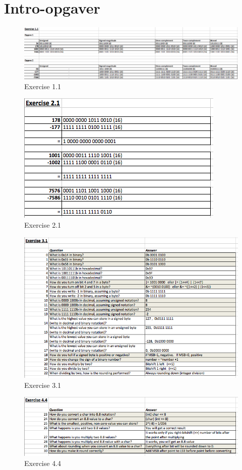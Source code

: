 \chapter{Intro-opgaver}

\begin{figure}[h!]
\centering
\includegraphics[scale=0.3]{figs/Ex1.png}
\caption{Exercise 1.1}
\label{fig:Ex1.1}
\end{figure}

\begin{figure}[h!]
\centering
\includegraphics[scale=0.6]{figs/Ex2.png}
\caption{Exercise 2.1}
\label{fig:Ex2.1}
\end{figure}

\begin{figure}[h!]
\centering
\includegraphics[scale=0.6]{figs/Ex3.png}
\caption{Exercise 3.1}
\label{fig:Ex3.1}
\end{figure}

\begin{figure}[h!]
\centering
\includegraphics[scale=0.6]{figs/Ex4.png}
\caption{Exercise 4.4}
\label{fig:Ex4.4}
\end{figure}
